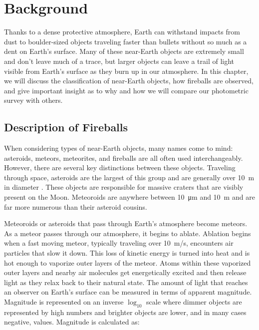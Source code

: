 \chapter{Background}

Thanks to a dense protective atmosphere, Earth can withstand impacts from dust to boulder-sized objects traveling faster than bullets without so much as a dent on Earth's surface.
Many of these near-Earth objects are extremely small and don't leave much of a trace, but larger objects can leave a trail of light visible from Earth's surface as they burn up in our atmosphere.
In this chapter, we will discuss the classification of near-Earth objects, how fireballs are observed, and give important insight as to why and how we will compare our photometric survey with others.


\section{Description of Fireballs}

When considering types of near-Earth objects, many names come to mind: asteroids, meteors, meteorites, and fireballs are all often used interchangeably. 
However, there are several key distinctions between these objects.  
Traveling through space, asteroids are the largest of this group and are generally over \SI{10}{\meter} in diameter \cite{steel_meteoroid_1996}. 
These objects are responsible for massive craters that are visibly present on the Moon.
Meteoroids are anywhere between \SI{10}{\micro\meter} and \SI{10}{\meter} and are far more numerous than their asteroid cousins.  

Meteoroids or asteroids that pass through Earth's atmosphere become meteors.
As a meteor passes through our atmosphere, it begins to ablate.
Ablation begins when a fast moving meteor, typically traveling over \SI{10}{\meter/\second}, encounters air particles that slow it down.
This loss of kinetic energy is turned into heat and is hot enough to vaporize outer layers of the meteor.  
Atoms within these vaporized outer layers and nearby air molecules get energetically excited and then release light as they relax back to their natural state.
The amount of light that reaches an observer on Earth's surface can be measured in terms of apparent magnitude.
Magnitude is represented on an inverse $\log_{10}$ scale where dimmer objects are represented by high numbers and brighter objects are lower, and in many cases negative, values.
Magnitude is calculated as:

